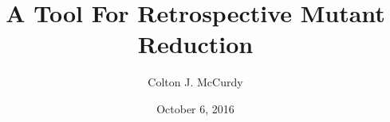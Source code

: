 \documentclass[hyperref]{beamer}
\title{A Tool For Retrospective Mutant Reduction}
\author[McCurdy]{Colton J. McCurdy}
\institute[ICSME 2016]{ICSME 2016}
\date[October 6, 2016]{October 6, 2016}
\begin{document}
\begin{frame}
  \titlepage
\end{frame}

% 
%
% 
%
% 
%
% 
%
% 
%
% 
\end{document}
